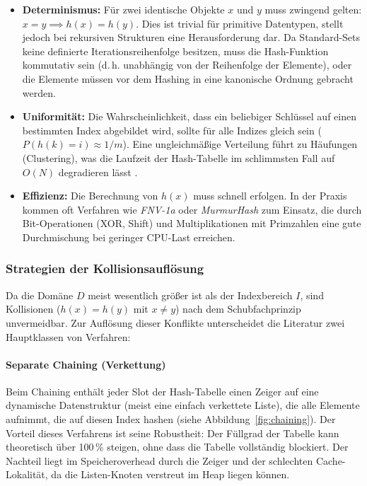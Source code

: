 \begin{itemize}
	\item \textbf{Determinismus:} Für zwei identische Objekte $x$ und $y$ muss zwingend gelten: $x = y \implies h(x) = h(y)$. Dies ist trivial für primitive Datentypen, stellt jedoch bei rekursiven Strukturen eine Herausforderung dar. Da Standard-Sets keine definierte Iterationsreihenfolge besitzen, muss die Hash-Funktion kommutativ sein (d.\,h. unabhängig von der Reihenfolge der Elemente), oder die Elemente müssen vor dem Hashing in eine kanonische Ordnung gebracht werden.
	\item \textbf{Uniformität:} Die Wahrscheinlichkeit, dass ein beliebiger Schlüssel auf einen bestimmten Index abgebildet wird, sollte für alle Indizes gleich sein ($P(h(k) = i) \approx 1/m$). Eine ungleichmäßige Verteilung führt zu Häufungen (Clustering), was die Laufzeit der Hash-Tabelle im schlimmsten Fall auf $O(N)$ degradieren lässt \autocite[S. 283]{cormen2022introduction}.
	\item \textbf{Effizienz:} Die Berechnung von $h(x)$ muss schnell erfolgen. In der Praxis kommen oft Verfahren wie \emph{FNV-1a} oder \emph{MurmurHash} zum Einsatz, die durch Bit-Operationen (XOR, Shift) und Multiplikationen mit Primzahlen eine gute Durchmischung bei geringer CPU-Last erreichen.
\end{itemize}

\subsubsection{Strategien der Kollisionsauflösung}
Da die Domäne $D$ meist wesentlich größer ist als der Indexbereich $I$, sind Kollisionen ($h(x) = h(y)$ mit $x \neq y$) nach dem Schubfachprinzip unvermeidbar. Zur Auflösung dieser Konflikte unterscheidet die Literatur zwei Hauptklassen von Verfahren:

\paragraph{Separate Chaining (Verkettung)}
Beim Chaining enthält jeder Slot der Hash-Tabelle einen Zeiger auf eine dynamische Datenstruktur (meist eine einfach verkettete Liste), die alle Elemente aufnimmt, die auf diesen Index hashen (siehe Abbildung~\ref{fig:chaining}).
Der Vorteil dieses Verfahrens ist seine Robustheit: Der Füllgrad der Tabelle kann theoretisch über 100\,\% steigen, ohne dass die Tabelle vollständig blockiert. Der Nachteil liegt im Speicheroverhead durch die Zeiger und der schlechten Cache-Lokalität, da die Listen-Knoten verstreut im Heap liegen können.

